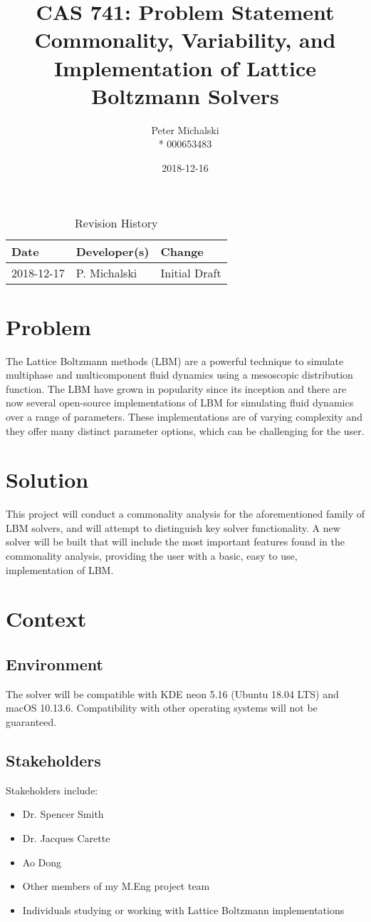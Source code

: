 \documentclass{article}
\title{CAS 741: Problem Statement\\ Commonality, Variability, and Implementation of Lattice Boltzmann Solvers}
\author{Peter Michalski \\* 000653483}
\date{2018-12-16}
\begin{document}
\maketitle

\begin{table}[hp]
\caption{Revision History} \label{TblRevisionHistory}
\begin{tabularx}{\textwidth}{llX}
\toprule
\textbf{Date} & \textbf{Developer(s)} & \textbf{Change}\\
\midrule
2018-12-17 & P. Michalski & Initial Draft\\
\bottomrule
\end{tabularx}
\end{table}

\section{Problem}
The Lattice Boltzmann methods (LBM) are a powerful technique to simulate multiphase and multicomponent fluid dynamics using a mesoscopic distribution function. The LBM have grown in popularity since its inception and there are now several open-source implementations of LBM for simulating fluid dynamics over a range of parameters. These implementations are of varying complexity and they offer many distinct parameter options, which can be challenging for the user.
   
\section{Solution}
This project will conduct a commonality analysis for the aforementioned family of LBM solvers, and will attempt to distinguish key solver functionality. A new solver will be built that will include the most important features found in the commonality analysis, providing the user with a basic, easy to use, implementation of LBM.

\section{Context}
\subsection{Environment}
The solver will be compatible with KDE neon 5.16 (Ubuntu 18.04 LTS) and macOS 10.13.6. Compatibility with other operating systems will not be guaranteed.

\subsection{Stakeholders}
Stakeholders include:
\begin{itemize}
\item Dr. Spencer Smith
\item Dr. Jacques Carette
\item Ao Dong
\item Other members of my M.Eng project team
\item Individuals studying or working with Lattice Boltzmann implementations
\end{itemize}
\end{document}
